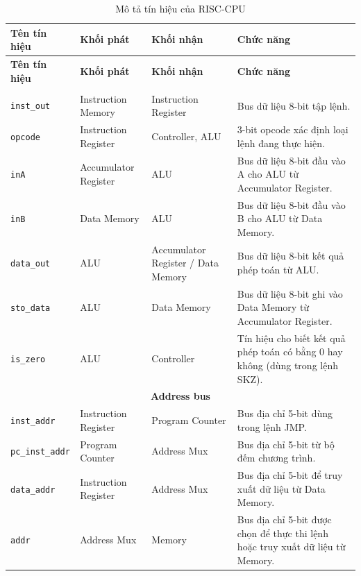         \begin{longtable}{|p{}|p{}|p{}|p{}|}
            \hline
            \textbf{Tên tín hiệu} & \textbf{Khối phát} & \textbf{Khối nhận} & \textbf{Chức năng} \\
            \hline
            \endfirsthead
            
            \hline
            \textbf{Tên tín hiệu} & \textbf{Khối phát} & \textbf{Khối nhận} & \textbf{Chức năng} \\
            \hline
            \endhead
            
            \hline
            \endfoot
            
            \hline
            \caption{Mô tả tín hiệu của RISC-CPU}
            \endlastfoot
            
            \multicolumn{4}{|c|}{\textbf{Data bus}} \\\hline
            \texttt{inst\_out} & Instruction Memory & Instruction Register & Bus dữ liệu 8-bit tập lệnh. \\
            \hline
            \texttt{opcode} & Instruction Register & Controller, ALU & 3-bit opcode xác định loại lệnh đang thực hiện. \\
            \hline
            \texttt{inA} & Accumulator Register & ALU & Bus dữ liệu 8-bit đầu vào A cho ALU từ Accumulator Register. \\
            \hline
            \texttt{inB} & Data Memory & ALU & Bus dữ liệu 8-bit đầu vào B cho ALU từ Data Memory. \\
            \hline
            \texttt{data\_out} & ALU & Accumulator Register / Data Memory & Bus dữ liệu 8-bit kết quả phép toán từ ALU. \\
            \hline
            \texttt{sto\_data} & ALU & Data Memory & Bus dữ liệu 8-bit ghi vào Data Memory từ Accumulator Register. \\
            \hline
            \texttt{is\_zero} & ALU & Controller & Tín hiệu cho biết kết quả phép toán có bằng 0 hay không (dùng trong lệnh SKZ). \\
            \hline

            \multicolumn{4}{|c|}{\textbf{Address bus}} \\\hline
            \texttt{inst\_addr} & Instruction Register & Program Counter & Bus địa chỉ 5-bit dùng trong lệnh JMP. \\
            \hline
            \texttt{pc\_inst\_addr} & Program Counter & Address Mux & Bus địa chỉ 5-bit từ bộ đếm chương trình. \\
            \hline
            \texttt{data\_addr} & Instruction Register & Address Mux & Bus địa chỉ 5-bit để truy xuất dữ liệu từ Data Memory. \\
            \hline
            \texttt{addr} & Address Mux & Memory & Bus địa chỉ 5-bit được chọn để thực thi lệnh hoặc truy xuất dữ liệu từ Memory. \\
            \hline
            

\end{longtable}
